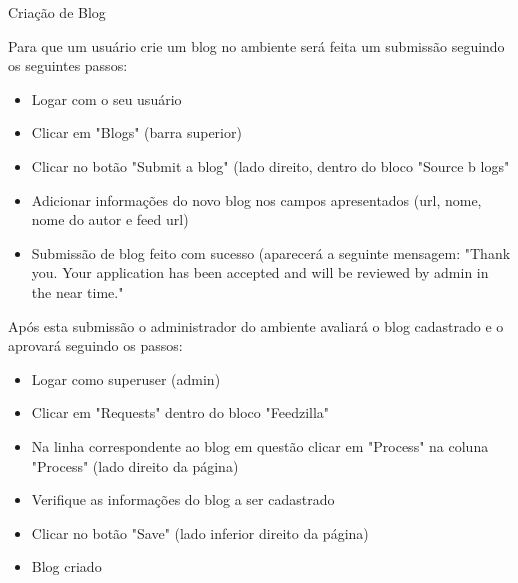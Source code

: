 Criação de Blog

Para que um usuário crie um blog no ambiente será feita um submissão seguindo os 
seguintes passos:

\begin{itemize}
\item Logar com o seu usuário
\item Clicar em "Blogs" (barra superior)
\item Clicar no botão "Submit a blog" (lado direito, dentro do bloco "Source b
logs"
\item Adicionar informações do novo blog nos campos apresentados (url, nome, 
nome do autor e feed url)
\item Submissão de blog feito com sucesso (aparecerá a seguinte mensagem: 
"Thank you. Your application has been accepted and will be reviewed by admin 
in the near time."
\end{itemize}

Após esta submissão o administrador do ambiente avaliará o blog cadastrado
e o aprovará seguindo os passos:

\begin{itemize}
\item Logar como superuser (admin)
\item Clicar em "Requests" dentro do bloco "Feedzilla"
\item Na linha correspondente ao blog em questão clicar em "Process" na coluna 
"Process" (lado direito da página)
\item Verifique as informações do blog a ser cadastrado
\item Clicar no botão "Save" (lado inferior direito da página)
\item Blog criado
\end{itemize}



 




